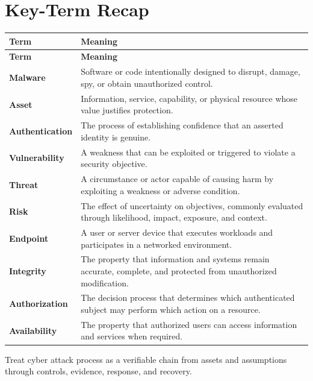\documentclass[11pt]{article}
\begin{document}
\section*{Key-Term Recap}
\begin{longtable}{>{\RaggedRight\arraybackslash}p{}>{\RaggedRight\arraybackslash}p{}}
\toprule\rowcolor{Navy}\color{white}\textbf{Term} & \color{white}\textbf{Meaning}\\\midrule
\endfirsthead
\toprule\rowcolor{Navy}\color{white}\textbf{Term} & \color{white}\textbf{Meaning}\\\midrule
\endhead
\textbf{Malware} & Software or code intentionally designed to disrupt, damage, spy, or obtain unauthorized control. \\\midrule
\textbf{Asset} & Information, service, capability, or physical resource whose value justifies protection. \\\midrule
\textbf{Authentication} & The process of establishing confidence that an asserted identity is genuine. \\\midrule
\textbf{Vulnerability} & A weakness that can be exploited or triggered to violate a security objective. \\\midrule
\textbf{Threat} & A circumstance or actor capable of causing harm by exploiting a weakness or adverse condition. \\\midrule
\textbf{Risk} & The effect of uncertainty on objectives, commonly evaluated through likelihood, impact, exposure, and context. \\\midrule
\textbf{Endpoint} & A user or server device that executes workloads and participates in a networked environment. \\\midrule
\textbf{Integrity} & The property that information and systems remain accurate, complete, and protected from unauthorized modification. \\\midrule
\textbf{Authorization} & The decision process that determines which authenticated subject may perform which action on a resource. \\\midrule
\textbf{Availability} & The property that authorized users can access information and services when required. \\\midrule
\bottomrule
\end{longtable}
\begin{takeawaybox}
Treat cyber attack process as a verifiable chain from assets and assumptions through controls, evidence, response, and recovery.
\end{takeawaybox}
\end{document}
